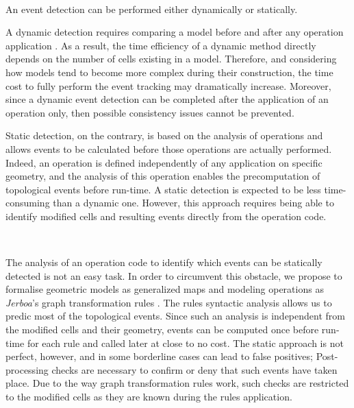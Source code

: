 ~

An event detection can be performed either dynamically or statically.

A dynamic detection requires comparing a model before and after any operation application  \cite{OCCT2023, baba2007generic}.
As a result, the time efficiency of a dynamic method directly depends on the number of cells existing in a model.
Therefore, and considering how models tend to become more complex during their construction, the time cost to fully perform the event tracking may dramatically increase.
Moreover, since a dynamic event detection can be completed after the application of an operation only, then possible consistency issues cannot be prevented.

Static detection, on the contrary, is based on the analysis of operations and allows events to be calculated before those operations are actually performed. Indeed, an operation is defined independently of any application on specific geometry, and the analysis of this operation enables the precomputation of topological events before run-time.
A static detection is expected to be less time-consuming than a dynamic one.
However, this approach requires being able to identify modified cells and resulting events directly from the operation code.  %

~

%
The analysis of an operation code to identify which events can be statically detected is not an easy task.
In order to circumvent this obstacle, we propose to formalise geometric models as generalized maps \cite{lienhardt1991topological} and  modeling operations as \textit{Jerboa}'s graph transformation rules \cite{belhaouari2014jerboa}.
The rules syntactic analysis allows us to predic most of the topological events.
Since such an analysis is independent from the modified cells and their geometry, events can be computed once before run-time for each rule and called later at close to no cost.
%
The static approach is not perfect, however, and in some borderline cases can lead to false positives; Post-processing checks are necessary to confirm or deny that such events have taken place.
Due to the way graph transformation rules work, such checks are restricted to the modified cells as they are known during the rules application.

